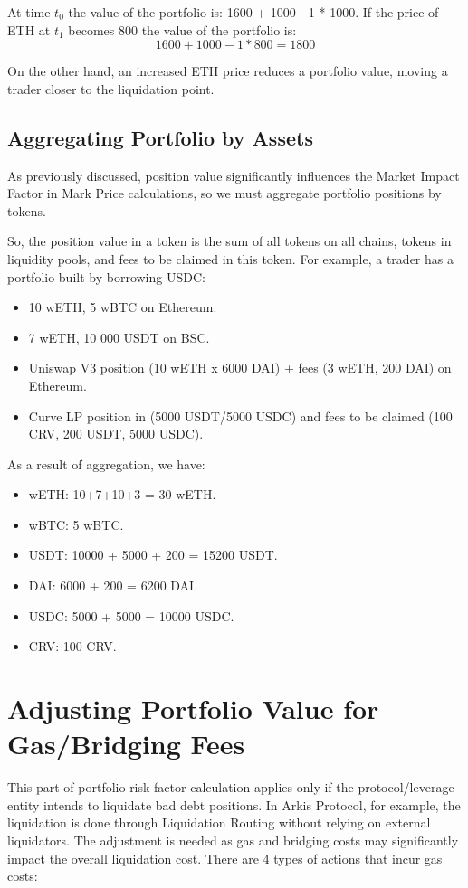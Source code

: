 \documentclass[conference]{IEEEtran}
\begin{document}
At time $t_{0}$ the value of the portfolio is: 1600 + 1000 - 1 * 1000. If the price of ETH at $t_{1}$ becomes 800 the value of the portfolio is: $$1600 +1000  - 1*800=1800$$

On the other hand, an increased ETH price reduces a portfolio value, moving a trader closer to the liquidation point. 



\subsection{Aggregating Portfolio by Assets}
As previously discussed, position value significantly influences the Market Impact Factor in Mark Price calculations, so we must aggregate portfolio positions by tokens. 

So, the position value in a token is the sum of all tokens on all chains, tokens in liquidity pools, and fees to be claimed in this token. For example, a trader has a portfolio built by borrowing USDC:
\begin{itemize}
	\item 10 wETH, 5 wBTC on Ethereum.
	\item 7 wETH, 10 000 USDT on BSC.
	\item Uniswap V3 position (10 wETH x 6000 DAI) + fees (3 wETH, 200 DAI) on Ethereum.
	\item Curve LP position in (5000 USDT/5000 USDC) and fees to be claimed (100 CRV, 200 USDT, 5000 USDC).
\end{itemize}

As a result of aggregation, we have:
\begin{itemize}
	\item wETH: 10+7+10+3 = 30 wETH.
	\item wBTC: 5 wBTC.
	\item USDT: 10000 + 5000 + 200 = 15200 USDT.
	\item DAI: 6000 + 200 = 6200 DAI.
	\item USDC: 5000 + 5000 = 10000 USDC.
	\item CRV: 100 CRV.
\end{itemize}

\section{Adjusting Portfolio Value for Gas/Bridging Fees}
This part of portfolio risk factor calculation applies only if the protocol/leverage entity intends to liquidate bad debt positions. In Arkis Protocol, for example, the liquidation is done through Liquidation Routing without relying on external liquidators. The adjustment is needed as gas and bridging costs may significantly impact the overall liquidation cost. There are 4 types of actions that incur gas costs:
\end{document}

